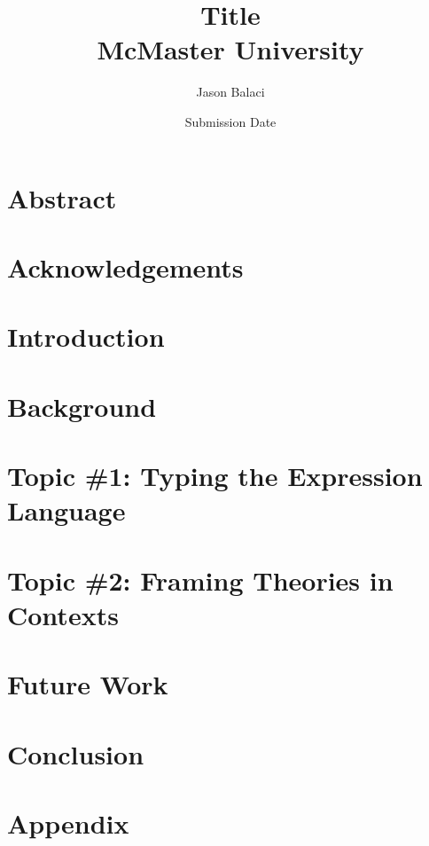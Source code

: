 \documentclass[12pt]{report}
\title{
    {Title}\\
    {McMaster University}
}
\author{Jason Balaci}
\date{Submission Date}
\begin{document}
    \maketitle

    \chapter*{Abstract}
    

    \chapter*{Acknowledgements}
    

    \tableofcontents

    \chapter{Introduction}
    

    \chapter{Background}
    
    
    \chapter{Topic \#1: Typing the Expression Language}
    
    
    \chapter{Topic \#2: Framing Theories in Contexts}
    


    \chapter{Future Work}
    
    
    \chapter{Conclusion}
    

    \appendix
    \chapter{Appendix}
    

\end{document}
